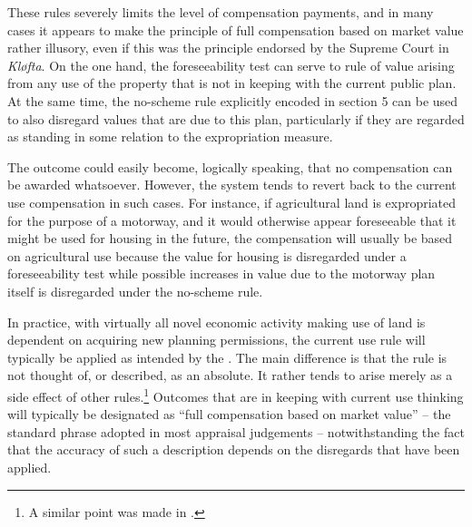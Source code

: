%
%

These rules severely limits the level of compensation payments, and in many cases it appears to make the principle of full compensation based on market value rather illusory, even if this was the principle endorsed by the Supreme Court in {\it Kløfta}. On the one hand, the foreseeability test can serve to rule of value arising from any use of the property that is not in keeping with the current public plan. At the same time, the no-scheme rule explicitly encoded in section 5 can be used to also disregard values that are due to this plan, particularly if they are regarded as standing in some relation to the expropriation measure. 

The outcome could easily become, logically speaking, that no compensation can be awarded whatsoever. However, the system tends to revert back to the current use compensation in such cases. For instance, if agricultural land is expropriated for the purpose of a motorway, and it would otherwise appear foreseeable that it might be used for housing in the future, the compensation will usually be based on agricultural use because the value for housing is disregarded under a foreseeability test while possible increases in value due to the motorway plan itself is disregarded under the no-scheme rule.

In practice, with virtually all novel economic activity making use of land is dependent on acquiring new planning permissions, the current use rule will typically be applied as intended by the \cite{ca73}. The main difference is that the rule is not thought of, or described, as an absolute. It rather tends to arise merely as a side effect of other rules.\footnote{A similar point was made in \cite{stordrange94}.} Outcomes that are in keeping with current use thinking will typically be designated as ``full compensation based on market value'' -- the standard phrase adopted in most appraisal judgements -- notwithstanding the fact that the accuracy of such a description depends on the disregards that have been applied.

